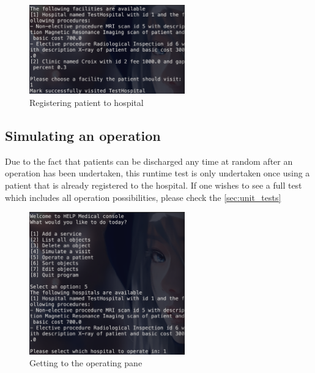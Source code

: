 \documentclass{article}
\begin{document}
	\begin{figure}
		\begin{center}
			\includegraphics[width=0.6\textwidth]{figures/Visiting/Register_hospital_02.png}
		\end{center}
		\caption{Registering patient to hospital}\label{fig:register_hospital_02}
	\end{figure}
	

	\newpage

	\subsection{Simulating an operation}\label{sub:simulating_an_operation} %
	Due to the fact that patients can be discharged any time at random after an operation has been undertaken, this runtime test is only undertaken once using a patient that is already registered to the hospital. If one wishes to see a full test which includes all operation possibilities, please check the \ref{sec:unit_tests}
	\begin{figure}
		\begin{center}
			\includegraphics[width=0.6\textwidth]{figures/Operating/Operating_hospital_01.png}
		\end{center}
		\caption{Getting to the operating pane}\label{fig:operating_hospital_01}
	\end{figure}
\end{document}
